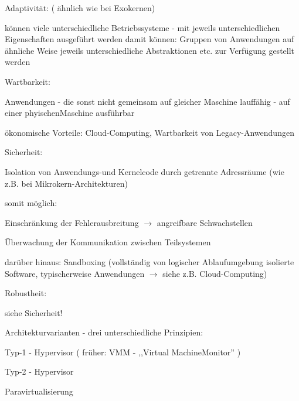 \documentclass[a4paper]{article}
\begin{document}
\begin{multicols}{3}
    \begin{itemize*}
        \item
        Adaptivität: ( ähnlich wie bei Exokernen)
        \begin{itemize*}
            \item können viele unterschiedliche Betriebssysteme - mit jeweils unterschiedlichen Eigenschaften ausgeführt werden damit können: Gruppen von Anwendungen auf ähnliche Weise jeweils unterschiedliche Abstraktionen etc. zur Verfügung gestellt werden
        \end{itemize*}
        \item
        Wartbarkeit:
        \begin{itemize*}
            \item Anwendungen - die sonst nicht gemeinsam auf gleicher Maschine lauffähig - auf einer phyischenMaschine ausführbar
            \item ökonomische Vorteile: Cloud-Computing, Wartbarkeit von Legacy-Anwendungen
        \end{itemize*}
        \item
        Sicherheit:
        \begin{itemize*}
            \item Isolation von Anwendungs-und Kernelcode durch getrennte Adressräume (wie z.B. bei Mikrokern-Architekturen)
            \item somit möglich: \begin{enumerate*}  \item   Einschränkung der Fehlerausbreitung $\rightarrow$    angreifbare Schwachstellen \item   Überwachung der Kommunikation zwischen Teilsystemen \end{enumerate*}
            \item darüber hinaus: Sandboxing (vollständig von logischer Ablaufumgebung isolierte Software, typischerweise Anwendungen $\rightarrow$  siehe z.B. Cloud-Computing)
        \end{itemize*}
        \item
        Robustheit:
        \begin{itemize*}
            \item siehe Sicherheit!
        \end{itemize*}
    \end{itemize*}

    Architekturvarianten - drei unterschiedliche Prinzipien:

    \begin{enumerate*}
        \item
        Typ-1 - Hypervisor ( früher: VMM - ,,Virtual MachineMonitor'' )
        \item
        Typ-2 - Hypervisor
        \item
        Paravirtualisierung
    \end{enumerate*}



\end{multicols}
\end{document}
